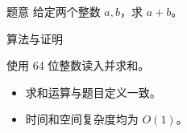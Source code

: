 \begin{frame}{题意}
给定两个整数 $a,b$，求 $a+b$。
\end{frame}
\begin{frame}{算法与证明}
\begin{cwnublock}[直接计算]
使用 64 位整数读入并求和。
\end{cwnublock}
\begin{itemize}
\item 求和运算与题目定义一致。
\pause
\item 时间和空间复杂度均为 $O(1)$。
\end{itemize}
\end{frame}

